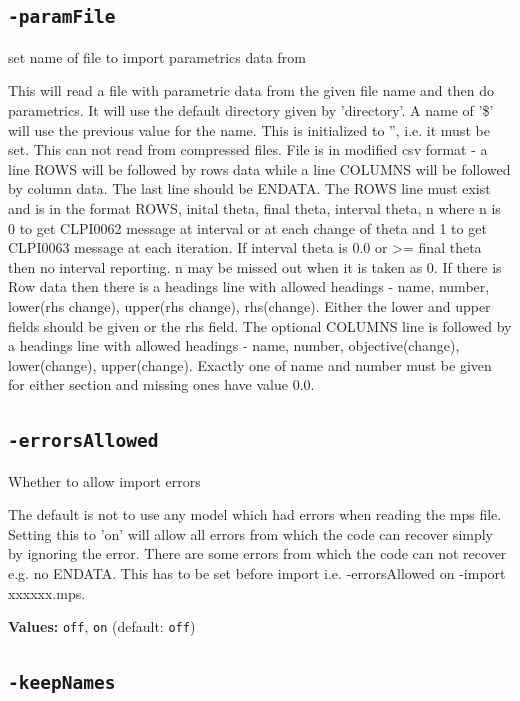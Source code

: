 \documentclass[11pt,a4paper]{article}
\begin{document}
\subsection*{\texttt{-paramFile}}

set name of file to import parametrics data from

This will read a file with parametric data from the given file name and then do parametrics. It will use the default directory given by 'directory'. A name of '\$' will use the previous value for the name. This is initialized to '', i.e. it must be set.  This can not read from compressed files. File is in modified csv format - a line ROWS will be followed by rows data while a line COLUMNS will be followed by column data.  The last line should be ENDATA. The ROWS line must exist and is in the format ROWS, inital theta, final theta, interval theta, n where n is 0 to get CLPI0062 message at interval or at each change of theta and 1 to get CLPI0063 message at each iteration.  If interval theta is 0.0 or >= final theta then no interval reporting.  n may be missed out when it is taken as 0.  If there is Row data then there is a headings line with allowed headings - name, number, lower(rhs change), upper(rhs change), rhs(change).  Either the lower and upper fields should be given or the rhs field. The optional COLUMNS line is followed by a headings line with allowed headings - name, number, objective(change), lower(change), upper(change). Exactly one of name and number must be given for either section and missing ones have value 0.0.

\subsection*{\texttt{-errorsAllowed}}

Whether to allow import errors

The default is not to use any model which had errors when reading the mps file. Setting this to 'on' will allow all errors from which the code can recover simply by ignoring the error.  There are some errors from which the code can not recover e.g. no ENDATA.  This has to be set before import i.e. -errorsAllowed on -import xxxxxx.mps.

\textbf{Values:} \texttt{off}, \texttt{on} (default: \texttt{off})

\subsection*{\texttt{-keepNames}}
\end{document}
